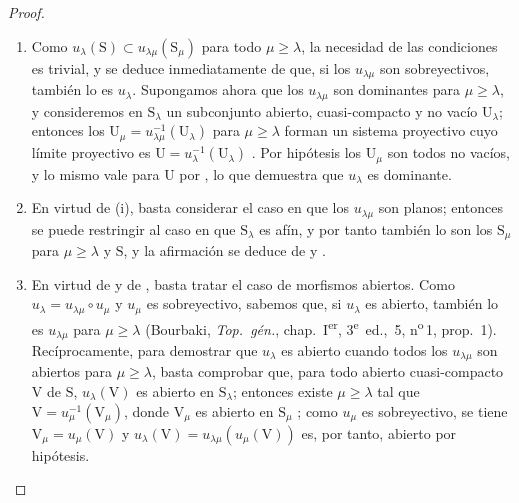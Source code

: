 \begin{proof}
\begin{enumerate}[label=(\roman*)]
   \item Como $u_\lambda(\mathrm{S})\subset u_{\lambda\mu}(\mathrm{S}_\mu)$ para todo $\mu\geqslant\lambda$, la necesidad de las condiciones es trivial, y se deduce inmediatamente de  que, si los $u_{\lambda\mu}$ son sobreyectivos, también lo es $u_\lambda$.
Supongamos ahora que los $u_{\lambda\mu}$ son dominantes para $\mu\geqslant\lambda$, y consideremos en $\mathrm{S}_\lambda$ un subconjunto abierto, cuasi-compacto y no vacío $\mathrm{U}_\lambda$; entonces los $\mathrm{U}_\mu=u_{\lambda\mu}^{-1}(\mathrm{U}_\lambda)$ para $\mu\geqslant\lambda$ forman un sistema proyectivo cuyo límite proyectivo es $\mathrm{U}=u_\lambda^{-1}(\mathrm{U}_\lambda)$ .
Por hipótesis los $\mathrm{U}_\mu$ son todos no vacíos, y lo mismo vale para $\mathrm{U}$ por , lo que demuestra que $u_\lambda$ es dominante.

   \item En virtud de (i), basta considerar el caso en que los $u_{\lambda\mu}$ son planos; entonces se puede restringir al caso en que $\mathrm{S}_\lambda$ es afín, y por tanto también lo son los $\mathrm{S}_\mu$ para $\mu\geqslant\lambda$ y $\mathrm{S}$, y la afirmación se deduce de  y .

   \item En virtud de  y de , basta tratar el caso de morfismos abiertos.
Como $u_\lambda=u_{\lambda\mu}\circ u_\mu$ y $u_\mu$ es sobreyectivo, sabemos que, si $u_\lambda$ es abierto, también lo es $u_{\lambda\mu}$ para $\mu\geqslant\lambda$ (Bourbaki, \emph{Top.\ g\'en.}, chap.~I\textsuperscript{er}, 3\textsuperscript{e}~ed., \textsection\,5, n\textsuperscript{o}\,1, prop.~1).
Recíprocamente, para demostrar que $u_\lambda$ es abierto cuando todos los $u_{\lambda\mu}$ son abiertos para $\mu\geqslant\lambda$, basta comprobar que, para todo abierto cuasi-compacto $\mathrm{V}$ de $\mathrm{S}$, $u_\lambda(\mathrm{V})$ es abierto en $\mathrm{S}_\lambda$; entonces existe $\mu\geqslant\lambda$ tal que $\mathrm{V}=u_\mu^{-1}(\mathrm{V}_\mu)$, donde $\mathrm{V}_\mu$ es abierto en $\mathrm{S}_\mu$ ; como $u_\mu$ es sobreyectivo, se tiene $\mathrm{V}_\mu=u_\mu(\mathrm{V})$ y $u_\lambda(\mathrm{V})=u_{\lambda\mu}(u_\mu(\mathrm{V}))$ es, por tanto, abierto por hipótesis.
\end{enumerate}


\end{proof}

